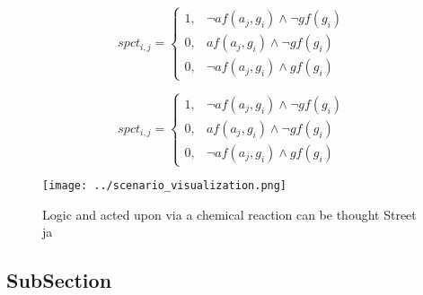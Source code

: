 \documentclass[a4paper]{article}
\begin{document}
\begin{equation}
spct_{i,j} =
\begin{cases}
1, & \text{$\neg af(a_j,g_i) \wedge \neg gf(g_i)$}\\
0, & \text{$af(a_j,g_i) \wedge \neg gf(g_i)$}\\
0, & \text{$\neg af(a_j,g_i) \wedge gf(g_i)$}
\end{cases}
\end{equation}

\begin{equation}
spct_{i,j} =
\begin{cases}
1, & \text{$\neg af(a_j,g_i) \wedge \neg gf(g_i)$}\\
0, & \text{$af(a_j,g_i) \wedge \neg gf(g_i)$}\\
0, & \text{$\neg af(a_j,g_i) \wedge gf(g_i)$}
\end{cases}
\end{equation}

\begin{figure}
\centering
\texttt{[image: ../scenario\_visualization.png]}
\caption{Logic and acted upon via a chemical reaction can be thought Street ja
}
\end{figure}
 
\subsection{SubSection}
\end{document}
